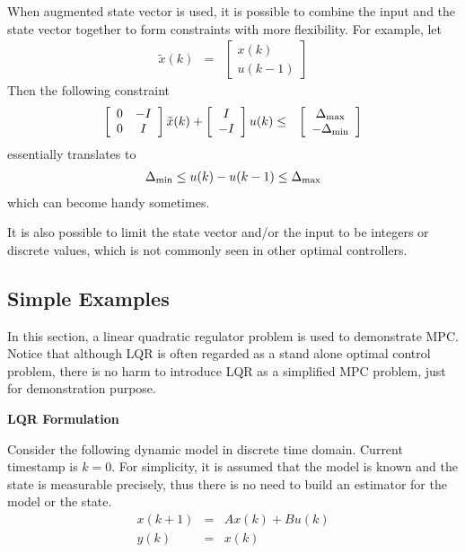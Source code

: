 When augmented state vector is used, it is possible to combine the input and the state vector together to form constraints with more flexibility. For example, let
\begin{eqnarray}
	\tilde{x}(k) &=& \left[\begin{array}{c}
		x(k) \\ u(k-1)
	\end{array}\right] \nonumber
\end{eqnarray}
Then the following constraint
\begin{eqnarray}
	\left[\begin{array}{cc}
		0 & -I \\ 0 & I
	\end{array}\right]\tilde{x}(k) + \left[\begin{array}{c}
	I \\ -I
\end{array}\right]u(k) &\leq& \left[\begin{array}{c}
\Delta_{\textup{max}} \\ -\Delta_{\textup{min}}
\end{array}\right] \nonumber
\end{eqnarray}
essentially translates to
\begin{eqnarray}
	\Delta_{\textup{min}} \leq u(k) - u(k-1) \leq \Delta_{\textup{max}} \nonumber
\end{eqnarray}
which can become handy sometimes.

It is also possible to limit the state vector and/or the input to be integers or discrete values, which is not commonly seen in other optimal controllers.

\subsection{Simple Examples}

In this section, a linear quadratic regulator problem is used to demonstrate MPC. Notice that although LQR is often regarded as a stand alone optimal control problem, there is no harm to introduce LQR as a simplified MPC problem, just for demonstration purpose.

\vspace{0.1in}
\noindent \textbf{LQR Formulation}
\vspace{0.1in}

Consider the following dynamic model in discrete time domain. Current timestamp is $k=0$. For simplicity, it is assumed that the model is known and the state is measurable precisely, thus there is no need to build an estimator for the model or the state.
\begin{eqnarray}
  x(k+1) &=& Ax(k) + Bu(k) \label{eq:lqrexp1} \\
  y(k) &=& x(k) \label{eq:lqrexp2}
\end{eqnarray}

